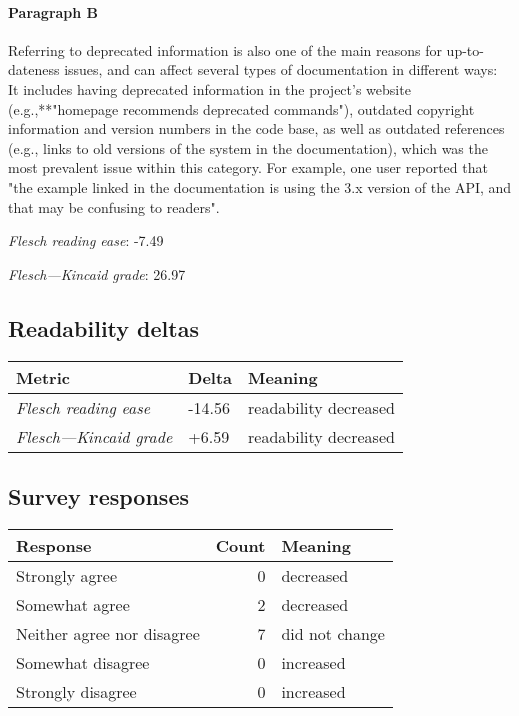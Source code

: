 \paragraph{Paragraph B}
Referring to deprecated information is also one of the main reasons for up-to-dateness issues, and can affect several types of documentation in different ways: It includes having deprecated information in the project's website (e.g.,**"homepage recommends deprecated commands"), outdated copyright information and version numbers in the code base, as well as outdated references (e.g., links to old versions of the system in the documentation), which was the most prevalent issue within this category. For example, one user reported that "the example linked in the documentation is using the 3.x version of the API, and that may be confusing to readers".\par\medskip
\emph{Flesch reading ease}: -7.49\par
\emph{Flesch---Kincaid grade}: 26.97

\subsection{Readability deltas}

\begin{tabular}{lll}
\toprule
               \textbf{Metric} & \textbf{Delta} &       \textbf{Meaning} \\
\midrule
    \emph{Flesch reading ease} &         -14.56 &  readability decreased \\
 \emph{Flesch---Kincaid grade} &          +6.59 &  readability decreased \\
\bottomrule
\end{tabular}

\subsection{Survey responses}
\begin{tabular}{lrl}
\toprule
          \textbf{Response} &  \textbf{Count} & \textbf{Meaning} \\
\midrule
             Strongly agree &               0 &        decreased \\
             Somewhat agree &               2 &        decreased \\
 Neither agree nor disagree &               7 &   did not change \\
          Somewhat disagree &               0 &        increased \\
          Strongly disagree &               0 &        increased \\
\bottomrule
\end{tabular}

